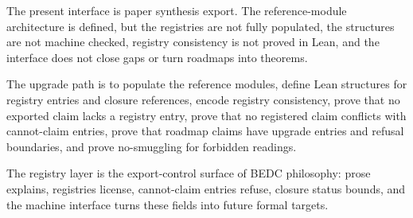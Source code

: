 \begin{definition}
\label{def:philosophy-machine-interface-status}
The present interface is paper synthesis export. The reference-module
architecture is defined, but the registries are not fully populated,
the structures are not machine checked, registry consistency is not
proved in Lean, and the interface does not close gaps or turn roadmaps
into theorems.
\end{definition}

\begin{definition}
\label{def:philosophy-interface-upgrade-path}
The upgrade path is to populate the reference modules, define Lean
structures for registry entries and closure references, encode registry
consistency, prove that no exported claim lacks a registry entry, prove
that no registered claim conflicts with cannot-claim entries, prove
that roadmap claims have upgrade entries and refusal boundaries, and
prove no-smuggling for forbidden readings.
\end{definition}

\begin{definition}
\label{def:philosophy-interface-compression}
The registry layer is the export-control surface of BEDC philosophy:
prose explains, registries license, cannot-claim entries refuse,
closure status bounds, and the machine interface turns these fields
into future formal targets.
\end{definition}

